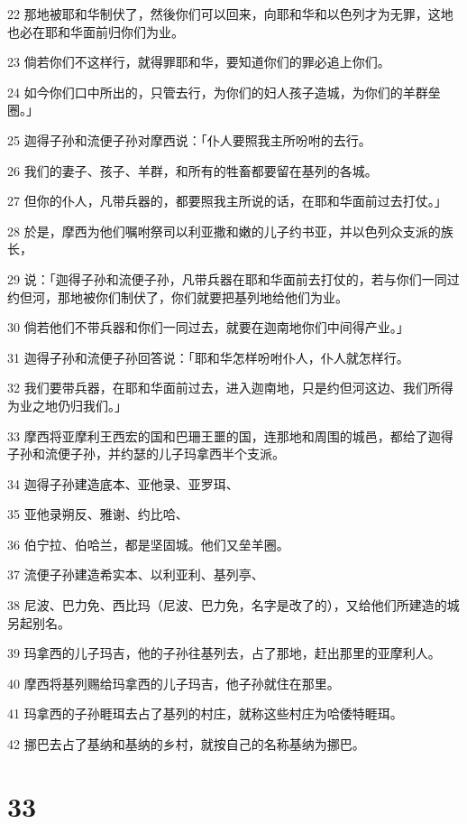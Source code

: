 \par 22 那地被耶和华制伏了，然後你们可以回来，向耶和华和以色列才为无罪，这地也必在耶和华面前归你们为业。
\par 23 倘若你们不这样行，就得罪耶和华，要知道你们的罪必追上你们。
\par 24 如今你们口中所出的，只管去行，为你们的妇人孩子造城，为你们的羊群垒圈。」
\par 25 迦得子孙和流便子孙对摩西说：「仆人要照我主所吩咐的去行。
\par 26 我们的妻子、孩子、羊群，和所有的牲畜都要留在基列的各城。
\par 27 但你的仆人，凡带兵器的，都要照我主所说的话，在耶和华面前过去打仗。」
\par 28 於是，摩西为他们嘱咐祭司以利亚撒和嫩的儿子约书亚，并以色列众支派的族长，
\par 29 说：「迦得子孙和流便子孙，凡带兵器在耶和华面前去打仗的，若与你们一同过约但河，那地被你们制伏了，你们就要把基列地给他们为业。
\par 30 倘若他们不带兵器和你们一同过去，就要在迦南地你们中间得产业。」
\par 31 迦得子孙和流便子孙回答说：「耶和华怎样吩咐仆人，仆人就怎样行。
\par 32 我们要带兵器，在耶和华面前过去，进入迦南地，只是约但河这边、我们所得为业之地仍归我们。」
\par 33 摩西将亚摩利王西宏的国和巴珊王噩的国，连那地和周围的城邑，都给了迦得子孙和流便子孙，并约瑟的儿子玛拿西半个支派。
\par 34 迦得子孙建造底本、亚他录、亚罗珥、
\par 35 亚他录朔反、雅谢、约比哈、
\par 36 伯宁拉、伯哈兰，都是坚固城。他们又垒羊圈。
\par 37 流便子孙建造希实本、以利亚利、基列亭、
\par 38 尼波、巴力免、西比玛（尼波、巴力免，名字是改了的），又给他们所建造的城另起别名。
\par 39 玛拿西的儿子玛吉，他的子孙往基列去，占了那地，赶出那里的亚摩利人。
\par 40 摩西将基列赐给玛拿西的儿子玛吉，他子孙就住在那里。
\par 41 玛拿西的子孙睚珥去占了基列的村庄，就称这些村庄为哈倭特睚珥。
\par 42 挪巴去占了基纳和基纳的乡村，就按自己的名称基纳为挪巴。

\chapter{33}

